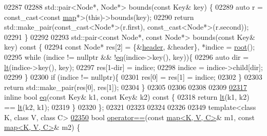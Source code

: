 \begin{DoxyCode}
02287 
02288     std::pair<Node*, Node*> bounds(\textcolor{keyword}{const} Key& key) \{
02289         \textcolor{keyword}{auto} r = \textcolor{keyword}{const\_cast<}\textcolor{keyword}{const }\hyperlink{classaed2_1_1map}{map}*\textcolor{keyword}{>}(\textcolor{keyword}{this})->bounds(key);
02290         \textcolor{keywordflow}{return} std::make\_pair(const\_cast<Node*>(r.first), const\_cast<Node*>(r.second));
02291     \}
02292 
02293     std::pair<const Node*, const Node*> bounds(\textcolor{keyword}{const} Key& key)\textcolor{keyword}{ const }\{
02294         \textcolor{keyword}{const} Node* res[2] = \{&\hyperlink{classaed2_1_1map_a92d93f905c8ad73fba18fdc7e8915cce_a92d93f905c8ad73fba18fdc7e8915cce}{header}, &header\}, *indice = \hyperlink{classaed2_1_1map_a07ab50eda249a57858a34037d4c4c7b2_a07ab50eda249a57858a34037d4c4c7b2}{root}();
02295         \textcolor{keywordflow}{while} (indice != \textcolor{keyword}{nullptr} && !\hyperlink{classaed2_1_1map_aebf6c09c424c39a874798165401b309e_aebf6c09c424c39a874798165401b309e}{eq}(indice->key(), key))\{
02296             \textcolor{keyword}{auto} dir = \hyperlink{classaed2_1_1map_a0e5be36fae0693e4665bd2a615e7550a_a0e5be36fae0693e4665bd2a615e7550a}{lt}(indice->key(), key);
02297             res[1-dir] = indice;
02298             indice = indice->child[dir];
02299         \}
02300         \textcolor{keywordflow}{if} (indice != \textcolor{keyword}{nullptr})\{
02301             res[0] = res[1] = indice;
02302         \}
02303         \textcolor{keywordflow}{return} std::make\_pair(res[0], res[1]);      
02304     \}
02305 
02306 
02308 
02309 
\hyperlink{classaed2_1_1map_aebf6c09c424c39a874798165401b309e_aebf6c09c424c39a874798165401b309e}{02317}     \textcolor{keyword}{inline} \textcolor{keywordtype}{bool} \hyperlink{classaed2_1_1map_aebf6c09c424c39a874798165401b309e_aebf6c09c424c39a874798165401b309e}{eq}(\textcolor{keyword}{const} Key& k1, \textcolor{keyword}{const} Key& k2)\textcolor{keyword}{ const }\{
02318         \textcolor{keywordflow}{return} \hyperlink{classaed2_1_1map_a0e5be36fae0693e4665bd2a615e7550a_a0e5be36fae0693e4665bd2a615e7550a}{lt}(k1, k2) == \hyperlink{classaed2_1_1map_a0e5be36fae0693e4665bd2a615e7550a_a0e5be36fae0693e4665bd2a615e7550a}{lt}(k2, k1);
02319     \}
02320 \};
02321 
02323 
02324 
02326 
02349 \textcolor{keyword}{template}<\textcolor{keyword}{class} K, \textcolor{keyword}{class} V, \textcolor{keyword}{class} C>
\hyperlink{classaed2_1_1map_abfc51b39670220e79037ac067006e933_abfc51b39670220e79037ac067006e933}{02350} \textcolor{keywordtype}{bool} \hyperlink{classaed2_1_1map_abfc51b39670220e79037ac067006e933_abfc51b39670220e79037ac067006e933}{operator==}(\textcolor{keyword}{const} \hyperlink{classaed2_1_1map}{map<K, V, C>}& m1, \textcolor{keyword}{const} \hyperlink{classaed2_1_1map}{map<K, V, C>}& m2) \{

\end{DoxyCode}

